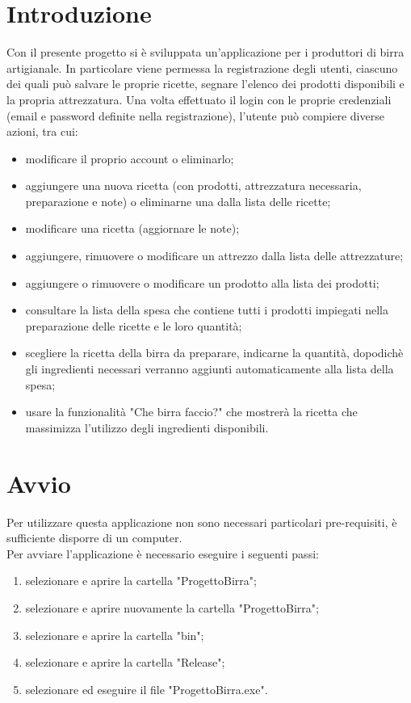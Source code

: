 \documentclass[a4paper, titlepage]{article}
\begin{document}
\section{Introduzione}
Con il presente progetto si è sviluppata un’applicazione per i produttori di birra artigianale. In particolare viene permessa la registrazione degli utenti, ciascuno dei quali può salvare le proprie ricette, segnare l’elenco dei prodotti disponibili e la propria attrezzatura. Una volta effettuato il login con le proprie credenziali (email e password definite nella registrazione), l’utente può compiere diverse azioni, tra cui:
\begin{itemize}
    \item modificare il proprio account o eliminarlo;
    \item aggiungere una nuova ricetta (con prodotti, attrezzatura necessaria, preparazione e note) o eliminarne una dalla lista delle ricette;
    \item modificare una ricetta (aggiornare le note);
    \item aggiungere, rimuovere o modificare un attrezzo dalla lista delle attrezzature;
    \item aggiungere o rimuovere o modificare un prodotto alla lista dei prodotti;
    \item consultare la lista della spesa che contiene tutti i prodotti impiegati nella preparazione delle ricette e le loro quantità;
    \item scegliere la ricetta della birra da preparare, indicarne la quantità, dopodichè gli ingredienti necessari verranno aggiunti automaticamente alla lista della spesa;
    \item usare la funzionalità "Che birra faccio?" che mostrerà la ricetta che massimizza l'utilizzo degli ingredienti disponibili.
\end{itemize}


\newpage

\section{Avvio}
Per utilizzare questa applicazione non sono necessari particolari pre-requisiti, è sufficiente disporre di un computer.\\
Per avviare l'applicazione è necessario eseguire i seguenti passi:
\begin{enumerate}
    \item selezionare e aprire la cartella "ProgettoBirra";
    \item selezionare e aprire nuovamente la cartella "ProgettoBirra";
    \item selezionare e aprire la cartella "bin";
    \item selezionare e aprire la cartella "Release";
    \item selezionare ed eseguire il file "ProgettoBirra.exe".\\
\end{enumerate}
\end{document}

